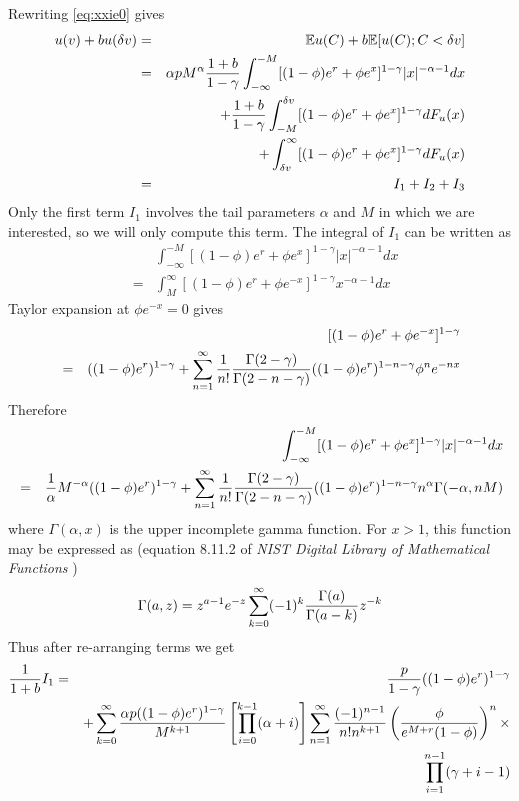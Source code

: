 \documentclass{article}
\begin{document}
Rewriting \eqref{eq:xxie0} gives
\begin{eqnarray*}
  u(v) + b u(\delta v) &=& \mathbb{E} u(C) + b \mathbb{E} [u(C); C < \delta v] \\
  &=& \alpha p M^\alpha{1 + b \over 1 - \gamma}\int_{-\infty}^{-M}
  [(1 - \phi) e^r + \phi e^x]^{1 - \gamma} |x|^{-\alpha-1} dx \\
  && + {1 + b \over 1 - \gamma}\int_{-M}^{\delta v}
  [(1 - \phi) e^r + \phi e^x]^{1 - \gamma} d F_u(x) \\
  && + \int_{\delta v}^{\infty}
  [(1 - \phi) e^r + \phi e^x]^{1 - \gamma} d F_u(x) \\
  &=& I_1 + I_2 + I_3
\end{eqnarray*}
Only the first term $I_1$ involves the tail parameters $\alpha$
and $M$ in which we are interested, so we will only compute this
term. The integral of $I_1$ can be written as
\begin{eqnarray*}
&& \int_{-\infty}^{-M}
[(1 - \phi) e^r + \phi e^x]^{1 - \gamma} |x|^{-\alpha-1} dx \\
&=& \int_{M}^{\infty}
[(1 - \phi) e^r + \phi e^{-x}]^{1 - \gamma} x^{-\alpha-1} dx
\end{eqnarray*}
Taylor expansion at $\phi e^{-x} = 0$ gives
\begin{eqnarray*}
  && [(1 - \phi) e^r + \phi e^{-x}]^{1 - \gamma} \\
  &=& ((1 - \phi) e^r)^{1 - \gamma}
  + \sum_{n=1}^{\infty} {1 \over n!}
  {\Gamma(2 - \gamma) \over \Gamma(2 - n -\gamma)}
  ((1 - \phi) e^r)^{1 - n - \gamma} \phi^n e^{-n x}
\end{eqnarray*}
Therefore
\begin{eqnarray*}
&& \int_{-\infty}^{-M}
[(1 - \phi) e^r + \phi e^x]^{1 - \gamma} |x|^{-\alpha-1} dx \\
&=&
{1 \over \alpha} M^{-\alpha} ((1 - \phi) e^r)^{1 - \gamma}
+ \sum_{n=1}^{\infty} {1 \over n!}
{\Gamma(2 - \gamma) \over \Gamma(2 - n -\gamma)}
((1 - \phi) e^r)^{1 - n - \gamma} n^\alpha \Gamma(-\alpha, n M)
\end{eqnarray*}
where $\Gamma(\alpha, x)$ is the upper incomplete gamma
function. For $x > 1$, this function may be expressed as (equation
8.11.2 of {\it NIST Digital Library of Mathematical Functions}
\cite{NIST.DLMF})
\[
\Gamma(a, z) = z^{a - 1} e^{-z}
\sum_{k=0}^\infty (-1)^k {\Gamma(a) \over \Gamma(a - k)} z^{-k}
\]
Thus after re-arranging terms we get
\begin{eqnarray}
  {1 \over 1 + b} I_1
  &=&
  {p \over 1 - \gamma} ((1 - \phi) e^r)^{1 - \gamma} \nonumber \\
  &&
  + \sum_{k=0}^\infty
  {\alpha p ((1 - \phi) e^r)^{1 - \gamma}\over M^{k+1}}
  \left[ \prod_{i=0}^{k-1} (\alpha + i) \right]
  \sum_{n=1}^\infty {(-1)^{n-1} \over n! n^{k+1}}
  \left(
  {\phi \over e^{M + r} (1 - \phi)}
  \right)^n \times \nonumber \\
  && \prod_{i=1}^{n-1} (\gamma + i - 1)
  \label{eq:xxie1}
\end{eqnarray}
\end{document}
